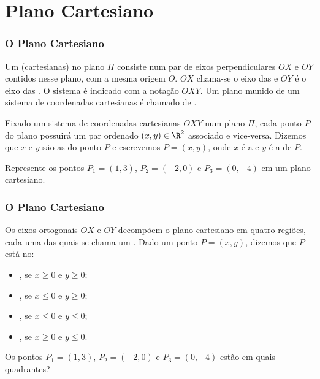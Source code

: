 \section{Plano Cartesiano}
\begin{frame}
\frametitle{O Plano Cartesiano}

\setcounter{teorema}{18}
\begin{definicao}
    Um  (cartesianas) no plano $\Pi$ consiste num par de eixos perpendiculares $OX$ e $OY$ contidos nesse plano, com a mesma origem $O$. $OX$ chama-se o eixo das  e $OY$ é o eixo das . O sistema é indicado com a notação $OXY$. Um plano munido de um sistema de coordenadas cartesianas é chamado de .
\end{definicao}\pause

Fixado um sistema de coordenadas cartesianas $OXY$ num plano $\Pi$, cada ponto $P$ do plano possuirá um par ordenado $(x, y) \in \R^2$ associado e vice-versa. Dizemos que $x$ e $y$ são as  do ponto $P$ e escrevemos $P = (x,y)$, onde $x$ é a  e $y$ é a  de $P$.\pause

\begin{exemplo}
    Represente os pontos $P_1 = (1,3)$, $P_2=(-2,0)$ e $P_3 = (0, -4)$ em um plano cartesiano.
\end{exemplo}


\end{frame}

\begin{frame}
    \frametitle{O Plano Cartesiano}

    \begin{definicao}
        Os eixos ortogonais $OX$ e $OY$ decompõem o plano cartesiano em quatro regiões, cada uma das quais se chama um . Dado um ponto $P= (x,y)$, dizemos que $P$ está no:
        \begin{itemize}
            \item {}, se $x \geq 0$ e $y\geq 0$;
            \item {}, se $x \leq 0$ e $y\geq 0$;
            \item {}, se $x \leq 0$ e $y\leq 0$;
            \item {}, se $x \geq 0$ e $y\leq 0$.
        \end{itemize}
    \end{definicao}\pause

    \begin{exemplo}
        Os pontos $P_1 = (1,3)$, $P_2=(-2,0)$ e $P_3 = (0, -4)$ estão em quais quadrantes?
    \end{exemplo}

\end{frame}

